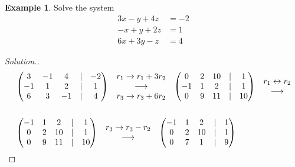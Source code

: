 \documentclass[11pt,a4paper]{article}
\theoremstyle{definition}
\newtheorem{exa}[thm]{Example}
\newenvironment{solution}
  {\renewcommand{\qedsymbol}{}\begin{proof}[\textit{Solution}.]}
  {\end{proof}}
\begin{document}
\begin{exa}
Solve the system
\begin{align*}
3x-y+4z&=-2\\-x+y+2z&=1\\6x+3y-z&=4
\end{align*}
\end{exa}
\begin{solution}
\begin{align*}
&
\begin{pmatrix}
3&-1&4&|&-2\\-1&1&2&|&1\\6&3&-1&|&4\\
\end{pmatrix}
\hspace{0.3cm}
\begin{matrix}
r_1\rightarrow r_1+3r_2\\ \longrightarrow\\ r_3\rightarrow r_3+6r_2\\
\end{matrix}
\hspace{0.3cm}
\begin{pmatrix}
0&2&10&|&1\\-1&1&2&|&1\\0&9&11&|&10\\
\end{pmatrix}
\hspace{0.3cm}
\begin{matrix}
r_1\leftrightarrow r_2\\ \longrightarrow\\
\end{matrix}\\\\
&
\begin{pmatrix}
-1&1&2&|&1\\0&2&10&|&1\\0&9&11&|&10\\
\end{pmatrix}
\hspace{0.3cm}
\begin{matrix}
r_3\rightarrow r_3-r_2\\ \longrightarrow\\
\end{matrix}
\hspace{0.3cm}
\begin{pmatrix}
-1&1&2&|&1\\0&2&10&|&1\\0&7&1&|&9\\
\end{pmatrix}

\end{align*}
\end{solution}
\end{document}
